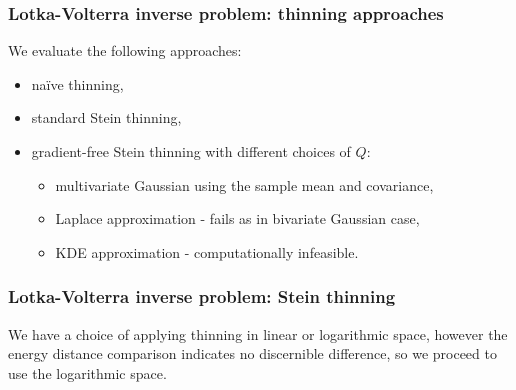 \documentclass{beamer}
\begin{document}
\begin{frame}
\frametitle{Lotka-Volterra inverse problem: thinning approaches}

We evaluate the following approaches:
\begin{itemize}
\item na\"ive thinning,
\item standard Stein thinning,
\item gradient-free Stein thinning with different choices of $Q$:
	\begin{itemize}
	\item multivariate Gaussian using the sample mean and covariance,
	\item Laplace approximation - \alert{fails as in bivariate Gaussian case},
	\item KDE approximation - \alert{computationally infeasible}.
	\end{itemize}
\end{itemize}

\end{frame}

\begin{frame}
\frametitle{Lotka-Volterra inverse problem: Stein thinning}

We have a choice of applying thinning in linear or logarithmic space, however the energy distance comparison indicates no discernible difference, so we proceed to use the logarithmic space.

\begin{figure}[h]
\centering
{}
\end{figure}

\end{frame}
\end{document}
